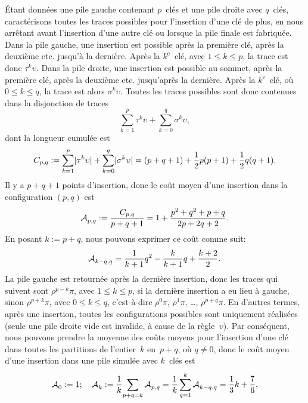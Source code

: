 Étant données une pile gauche contenant \(p\)~clés et une pile droite
avec \(q\)~clés, caractérisons toutes les traces possibles pour
l'insertion d'une clé de plus, en nous arrêtant avant l'insertion
d'une autre clé ou lorsque la pile finale est fabriquée. Dans la pile
gauche, une insertion est possible après la première clé, après la
deuxième etc. jusqu'à la dernière. Après la \(k^\text{e}\)~clé, avec
\(1 \leqslant k \leqslant p\), la trace est donc
\(\tau^k\upsilon\). Dans la pile droite, une insertion est possible au
sommet, après la première clé, après la deuxième etc. jusqu'après la
dernière. Après la \(k^\text{e}\)~clé, où \(0 \leqslant k \leqslant
q\), la trace est alors \(\sigma^k\upsilon\). Toutes les traces
possibles sont donc contenues dans la disjonction de traces
\begin{equation*}
\sum_{k=1}^{p}{\tau^k\upsilon} + \sum_{k=0}^{q}{\sigma^k\upsilon},
\end{equation*}
dont la longueur cumulée est
\begin{equation*}
C_{p,q} := \sum_{k=1}^{p}\lvert{\tau^k\upsilon}\rvert{} +
\sum_{k=0}^{q}\lvert{\sigma^k\upsilon}\rvert{}
= (p+q+1) + \frac{1}{2}p(p+1) + \frac{1}{2}q(q+1).
\end{equation*}
Il y a \(p+q+1\) points d'insertion, donc le coût moyen d'une
insertion dans la configuration \((p,q)\) est
\begin{equation}
\mathcal{A}_{p,q}^{} := \frac{C_{p,q}}{p+q+1}
           = 1 + \frac{p^2 + q^2 + p + q}{2p + 2q + 2}.
\label{eq:Mpq}
\end{equation}
En posant \(k := p + q\), nous pouvons exprimer ce coût comme suit:
\begin{equation*}
\mathcal{A}_{k-q,q}^{} = \frac{1}{k+1}{q^2} - \frac{k}{k+1}{q} + \frac{k+2}{2}.
\end{equation*}
La pile gauche est retournée après la dernière insertion, donc les
traces qui suivent sont \(\rho^{p-k}\pi\), avec \(1 \leqslant k
\leqslant p\), si la dernière insertion a eu lieu à gauche, sinon
\(\rho^{p+k}\pi\), avec \(0 \leqslant k \leqslant q\), c'est-à-dire
\(\rho^0\pi\), \(\rho^1\pi\), \ldots, \(\rho^{p+q}\pi\). En d'autres
termes, après une insertion, toutes les configurations possibles sont
uniquement réalisées (seule une pile droite vide est invalide, à cause
de la règle~\(\upsilon\)). Par conséquent, nous pouvons prendre la
moyenne des coûts moyens pour l'insertion d'une clé dans toutes les
partitions de l'entier~\(k\) en~\(p + q\), où \(q \neq 0\), donc le
coût moyen d'une insertion dans une pile simulée avec \(k\)~clés est
\begin{equation*}
\mathcal{A}_{0}^{} := 1;\quad
\mathcal{A}_{k}^{} := \frac{1}{k}\!\sum_{p+q=k}\mathcal{A}_{p,q}^{}
         = \frac{1}{k}\sum_{q=1}^{k}\mathcal{A}_{k-q,q}^{}
         = \frac{1}{3}k + \frac{7}{6},
\end{equation*}
